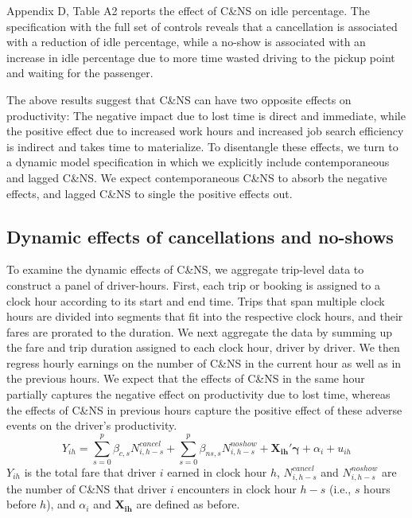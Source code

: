 \documentclass[reviewmode]{restat}
\begin{document}
Appendix D, Table A2 reports the effect of C\&NS on idle percentage. The specification with the full 
set of controls reveals that a cancellation is associated with a reduction of idle percentage, while 
a no-show is associated with an increase in idle percentage due to more time wasted driving to the pickup
point and waiting for the passenger.

The above results suggest that C\&NS can have two opposite effects on productivity: The negative impact 
due to lost time is direct and immediate, while the positive effect due to increased work hours and increased 
job search efficiency is indirect and takes time to materialize. To disentangle these effects, we turn to a
dynamic model specification in which we explicitly include contemporaneous and lagged C\&NS. 
We expect contemporaneous C\&NS to absorb the negative effects, and lagged C\&NS to single the 
positive effects out.


\subsection{Dynamic effects of cancellations and no-shows}
To examine the dynamic effects of C\&NS, we aggregate trip-level data to construct a panel of driver-hours. 
First, each trip or booking is assigned to a clock hour according to its start and end time.
Trips that span multiple clock hours are divided into segments that fit into the respective clock hours,
and their fares are prorated to the duration. We next aggregate the data by summing up the fare and trip 
duration assigned to each clock hour, driver by driver. We then regress hourly earnings 
on the number of C\&NS in the current hour as well as in the previous hours. We expect that the effects of
C\&NS in the same hour partially captures the negative effect on productivity due to lost time, 
whereas the effects of C\&NS in previous hours capture the positive effect of these adverse events on 
the driver's productivity.
\begin{equation}
Y_{ih} = \sum_{s=0}^p \beta_{c,s} N^{cancel}_{i,h-s} + \sum_{s=0}^p \beta_{ns,s} N^{noshow}_{i,h-s} +  \mathbf{X_{ih}}'\mathbf{\gamma} + \alpha_i + u_{ih}
\end{equation}
$Y_{ih}$ is the total fare that driver $i$ earned in clock hour $h$, $N^{cancel}_{i, h-s}$ and $N^{noshow}_{i, h-s}$ are the number of C\&NS that driver $i$ encounters in clock hour $h-s$ (i.e., $s$ hours before $h$), and $\alpha_i$ and $\mathbf{X_{ih}}$ are defined as before.
\end{document}
